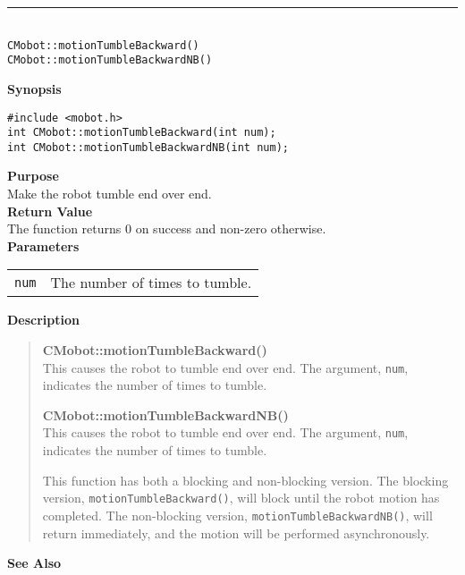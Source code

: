 \noindent
\vspace{5pt}
\rule{4.5in}{0.015in}\\
\noindent
{\LARGE \texttt{CMobot::motionTumbleBackward()}}\\
{\LARGE \texttt{CMobot::motionTumbleBackwardNB()}}\\
{}

\noindent
{\bf Synopsis}
\vspace{-8pt}
\begin{verbatim}
#include <mobot.h>
int CMobot::motionTumbleBackward(int num);
int CMobot::motionTumbleBackwardNB(int num);
\end{verbatim}

\noindent
{\bf Purpose}\\
Make the robot tumble end over end.\\

\noindent
{\bf Return Value}\\
The function returns 0 on success and non-zero otherwise.\\

\noindent
{\bf Parameters}\\
\vspace{-0.1in}
\begin{description}
\item               
\begin{tabular}{p{10 mm}p{145 mm}}
\texttt{num} & The number of times to tumble. \\
\end{tabular}
\end{description}

\noindent
{\bf Description}\\
\vspace{-12pt}
\begin{quote}
{\bf CMobot::motionTumbleBackward()}\\
This causes the robot to tumble end over end. The argument, \texttt{num},
indicates the number of times to tumble.

{\bf CMobot::motionTumbleBackwardNB()}\\
This causes the robot to tumble end over end. The argument, \texttt{num},
indicates the number of times to tumble.

This function has both a blocking and non-blocking version.
The blocking version, \texttt{motionTumbleBackward()}, will block until the
robot motion has completed. The non-blocking version, \texttt{motionTumbleBackwardNB()},
will return immediately, and the motion will be performed asynchronously.\\
\end{quote}

\noindent
{\bf See Also}\\

